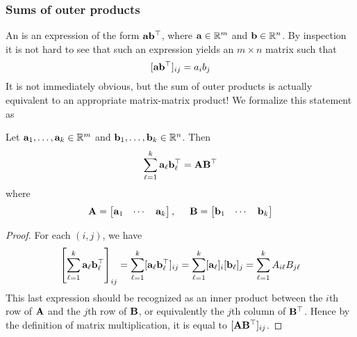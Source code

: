 \subsubsection{Sums of outer products}
An  is an expression of the form $\mathbf{a}\mathbf{b}^\top$, where $\mathbf{a} \in \mathbb{R}^m$ and $\mathbf{b} \in \mathbb{R}^n$.
By inspection it is not hard to see that such an expression yields an $m \times n$ matrix such that
\[[\mathbf{a}\mathbf{b}^\top]_{ij} = a_ib_j\]
It is not immediately obvious, but the sum of outer products is actually equivalent to an appropriate matrix-matrix product!
We formalize this statement as
\begin{proposition}
Let $\mathbf{a}_1, \dots, \mathbf{a}_k \in \mathbb{R}^m$ and $\mathbf{b}_1, \dots, \mathbf{b}_k \in \mathbb{R}^n$. Then
\[\sum_{\ell=1}^k \mathbf{a}_\ell\mathbf{b}_\ell^\top = \mathbf{A}\mathbf{B}^\top\]
where
\[\mathbf{A} = \begin{bmatrix}\mathbf{a}_1 & \cdots & \mathbf{a}_k\end{bmatrix}, \hspace{0.5cm} \mathbf{B} = \begin{bmatrix}\mathbf{b}_1 & \cdots & \mathbf{b}_k\end{bmatrix}\]
\end{proposition}
\begin{proof}
For each $(i,j)$, we have
\[\left[\sum_{\ell=1}^k \mathbf{a}_\ell\mathbf{b}_\ell^\top\right]_{ij} = \sum_{\ell=1}^k [\mathbf{a}_\ell\mathbf{b}_\ell^\top]_{ij} = \sum_{\ell=1}^k [\mathbf{a}_\ell]_i[\mathbf{b}_\ell]_j = \sum_{\ell=1}^k A_{i\ell}B_{j\ell}\]
This last expression should be recognized as an inner product between the $i$th row of $\mathbf{A}$ and the $j$th row of $\mathbf{B}$, or equivalently the $j$th column of $\mathbf{B}^\top$.
Hence by the definition of matrix multiplication, it is equal to $[\mathbf{A}\mathbf{B}^\top]_{ij}$.
\end{proof}

